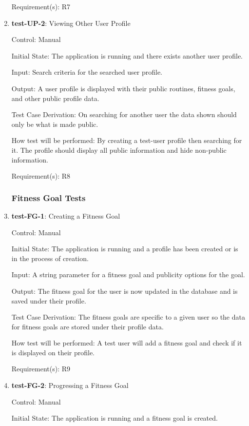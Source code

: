 \documentclass[12pt, titlepage]{article}
\begin{document}
\begin{enumerate}
		Requirement(s): R7
		
		\item{\textbf{test-UP-2}}: Viewing Other User Profile
		
		Control: Manual
		
		Initial State: The application is running and there exists another user profile.
		
		Input: Search criteria for the searched user profile.
		
		Output: A user profile is displayed with their public routines, fitness goals, and other public profile data.
		
		Test Case Derivation: On searching for another user the data shown should only be what is made public.
		
		How test will be performed: By creating a test-user profile then searching for it. The profile should display all public information and hide non-public information. 
		
		Requirement(s): R8
		
		\subsubsection{Fitness Goal Tests}
		
		\item{\textbf{test-FG-1}}: Creating a Fitness Goal
		
		Control: Manual
		
		Initial State: The application is running and a profile has been created or is in the process of creation.
		
		Input: A string parameter for a fitness goal and publicity options for the goal.
		
		Output: The fitness goal for the user is now updated in the database and is saved under their profile.
		
		Test Case Derivation: The fitness goals are specific to a given user so the data for fitness goals are stored under their profile data.
		
		How test will be performed: A test user will add a fitness goal and check if it is displayed on their profile.
		
		Requirement(s): R9
		
		\item{\textbf{test-FG-2}}: Progressing a Fitness Goal
		
		Control: Manual
		
		Initial State: The application is running and a fitness goal is created.
		

\end{enumerate}
\end{document}
